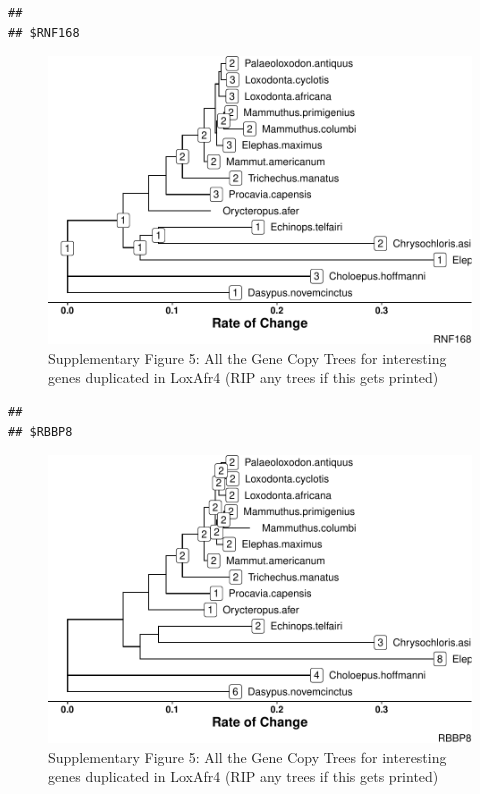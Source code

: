 \documentclass[10pt,letterpaper]{article}
\begin{document}
\begin{verbatim}
## 
## $RNF168
\end{verbatim}

\begin{figure}
\centering
\includegraphics{paper_PLOS_draft_files/figure-latex/Supplementary Figure 5-8.pdf}
\caption{Supplementary Figure 5: All the Gene Copy Trees for interesting
genes duplicated in LoxAfr4 (RIP any trees if this gets printed)}
\end{figure}

\begin{verbatim}
## 
## $RBBP8
\end{verbatim}

\begin{figure}
\centering
\includegraphics{paper_PLOS_draft_files/figure-latex/Supplementary Figure 5-9.pdf}
\caption{Supplementary Figure 5: All the Gene Copy Trees for interesting
genes duplicated in LoxAfr4 (RIP any trees if this gets printed)}
\end{figure}
\end{document}
